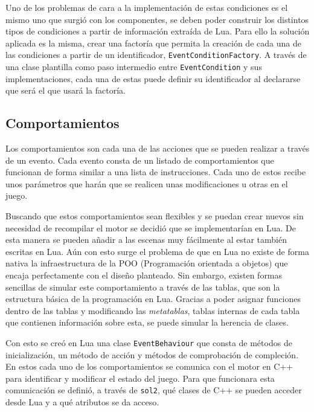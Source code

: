 \medskip

Uno de los problemas de cara a la implementación de estas condiciones es el mismo uno que surgió con los componentes, se deben poder construir los distintos tipos de condiciones a partir de información extraída de Lua. Para ello la solución aplicada es la misma, crear una factoría que permita la creación de cada una de las condiciones a partir de un identificador, \texttt{EventConditionFactory}. A través de una clase plantilla como paso intermedio entre \texttt{EventCondition} y sus implementaciones, cada una de estas puede definir su identificador al declararse que será el que usará la factoría. 

\subsection{Comportamientos}
Los comportamientos son cada una de las acciones que se pueden realizar a través de un evento. Cada evento consta de un listado de comportamientos que funcionan de forma similar a una lista de instrucciones. Cada uno de estos recibe unos parámetros que harán que se realicen unas modificaciones u otras en el juego. 

\medskip

Buscando que estos comportamientos sean flexibles y se puedan crear nuevos sin necesidad de recompilar el motor se decidió que se implementarían en Lua. De esta manera se pueden añadir a las escenas muy fácilmente al estar también escritas en Lua. Aún con esto surge el problema de que en Lua no existe de forma nativa la infraestructura de la POO (Programación orientada a objetos) que encaja perfectamente con el diseño planteado. Sin embargo, existen formas sencillas de simular este comportamiento a través de las tablas, que son la estructura básica de la programación en Lua. Gracias a poder asignar funciones dentro de las tablas y modificando las \textit{metatablas}, tablas internas de cada tabla que contienen información sobre esta, se puede simular la herencia de clases. 

\medskip

Con esto se creó en Lua una clase \texttt{EventBehaviour} que consta de métodos de inicialización, un método de acción y métodos de comprobación de compleción. En estos cada uno de los comportamientos se comunica con el motor en C++ para identificar y modificar el estado del juego. Para que funcionara esta comunicación se definió, a través de \texttt{sol2}, qué clases de C++ se pueden acceder desde Lua y a qué atributos se da acceso. 

